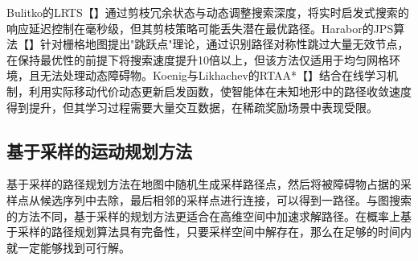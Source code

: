 \documentclass[master,academic]{ysuthesis} %
\begin{document}
		Bulitko的LRTS【】通过剪枝冗余状态与动态调整搜索深度，将实时启发式搜索的响应延迟控制在毫秒级，但其剪枝策略可能丢失潜在最优路径。Harabor的JPS算法【】针对栅格地图提出"跳跃点"理论，通过识别路径对称性跳过大量无效节点，在保持最优性的前提下将搜索速度提升10倍以上，但该方法仅适用于均匀网格环境，且无法处理动态障碍物。Koenig与Likhachev的RTAA*【】结合在线学习机制，利用实际移动代价动态更新启发函数，使智能体在未知地形中的路径收敛速度得到提升，但其学习过程需要大量交互数据，在稀疏奖励场景中表现受限。

		\subsection{基于采样的运动规划方法}
		基于采样的路径规划方法在地图中随机生成采样路径点，然后将被障碍物占据的采样点从候选序列中去除，最后相邻的采样点进行连接，可以得到一路径。与图搜索的方法不同，基于采样的规划方法更适合在高维空间中加速求解路径。在概率上基于采样的路径规划算法具有完备性，只要采样空间中解存在，那么在足够的时间内就一定能够找到可行解。
\end{document}
